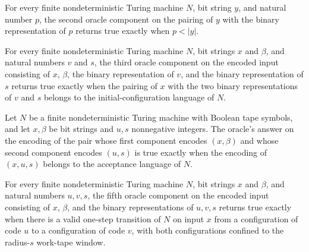 \begin{lemma}
\label{Complexity.PathHard.orc_len}
\leanok
{}
For every finite nondeterministic Turing machine $N$, bit string $y$, and natural number
$p$, the second oracle component on the pairing of $y$ with the binary representation of
$p$ returns true exactly when $p<|y|$.
\end{lemma}

\begin{lemma}
\label{Complexity.PathHard.orc_init}
\leanok
{}
For every finite nondeterministic Turing machine $N$, bit strings $x$ and $\beta$, and
natural numbers $v$ and $s$, the third oracle component on the encoded input consisting
of $x$, $\beta$, the binary representation of $v$, and the binary representation of $s$
returns true exactly when the pairing of $x$ with the two binary representations of $v$
and $s$ belongs to the initial-configuration language of $N$.
\end{lemma}

\begin{lemma}
\label{Complexity.PathHard.orc_acc}
\leanok
{}
Let $N$ be a finite nondeterministic Turing machine with Boolean tape symbols, and let
$x,\beta$ be bit strings and $u,s$ nonnegative integers. The oracle's answer on the
encoding of the pair whose first component encodes $(x,\beta)$ and whose second
component encodes $(u,s)$ is true exactly when the encoding of $(x,u,s)$ belongs to the
acceptance language of $N$.
\end{lemma}

\begin{lemma}
\label{Complexity.PathHard.orc_step}
\leanok
{}
For every finite nondeterministic Turing machine $N$, bit strings $x$ and $\beta$, and
natural numbers $u,v,s$, the fifth oracle component on the encoded input consisting of
$x$, $\beta$, and the binary representations of $u,v,s$ returns true exactly when there
is a valid one-step transition of $N$ on input $x$ from a configuration of code $u$ to a
configuration of code $v$, with both configurations confined to the radius-$s$ work-tape
window.
\end{lemma}
